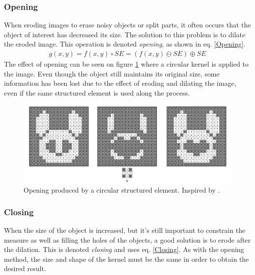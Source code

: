 \subsubsection{Opening}
When eroding images to erase noisy objects or split parts, it often occurs that the object of interest has decreased its size. The solution to this problem is to dilate the eroded image. This operation is denoted \textit{opening}, as shown in eq. \ref{Opening}.
\begin{equation}
\begin{aligned}
{g(x,y)}={f(x,y)}\circ{SE}=({f(x,y)}\ominus{SE})\oplus{SE}
\label{Opening}
	\end{aligned}
\end{equation}
The effect of opening can be seen on figure \ref{fig:Opening} where a circular kernel is applied to the image. Even though the object still maintains its original size, some information has been lost due to the effect of eroding and dilating the image, even if the same structured element is used along the process.

\begin{figure}[htbp]
\centering
\includegraphics[width=1\textwidth]{Pictures/Theory/OpeningCirc.png}
\caption{Opening produced by a circular structured element. Inspired by \citep{ip_book}.}
\label{fig:Opening}
\end{figure}

\subsubsection{Closing}\label{closing}
When the size of the object is increased, but it's still important to constrain the measure as well as filling the holes of the objects, a good solution is to erode after the dilation. This is denoted \textit{closing} and uses eq. \ref{Closing}. As with the opening method, the size and shape of the kernel must be the same in order to obtain the desired result.

